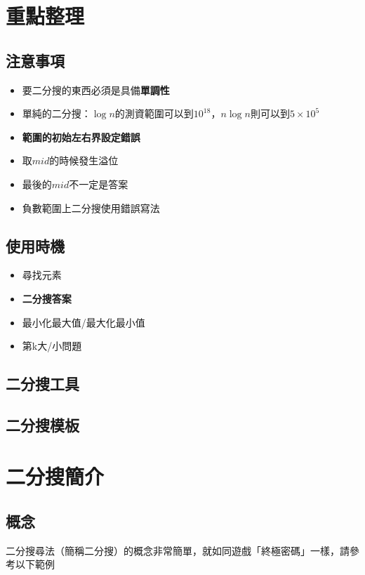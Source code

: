 \documentclass[12pt]{article}
\begin{document}
    \section{重點整理}
    \subsection{注意事項}
    \begin{itemize}
        \itemsep=5pt
        \item 要二分搜的東西必須是具備\textbf{單調性}
        \item 單純的二分搜：$\log{n}$的測資範圍可以到$10^{18}$，$n\log{n}$則可以到$5\times10^5$
        \item \textbf{範圍的初始左右界設定錯誤}
        \item 取$mid$的時候發生溢位
        \item 最後的$mid$不一定是答案
        \item 負數範圍上二分搜使用錯誤寫法
    \end{itemize}

    \subsection{使用時機}
    \begin{itemize}
        \item 尋找元素
        \item \textbf{二分搜答案}
        \item 最小化最大值/最大化最小值
        \item 第k大/小問題
    \end{itemize}

    \subsection{二分搜工具}
    
    \pagebreak

    \subsection{二分搜模板}
    
    \pagebreak

    \section{二分搜簡介}
    \subsection{概念}
    二分搜尋法（簡稱二分搜）的概念非常簡單，就如同遊戲「終極密碼」一樣，請參考以下範例\\
    
\end{document}
